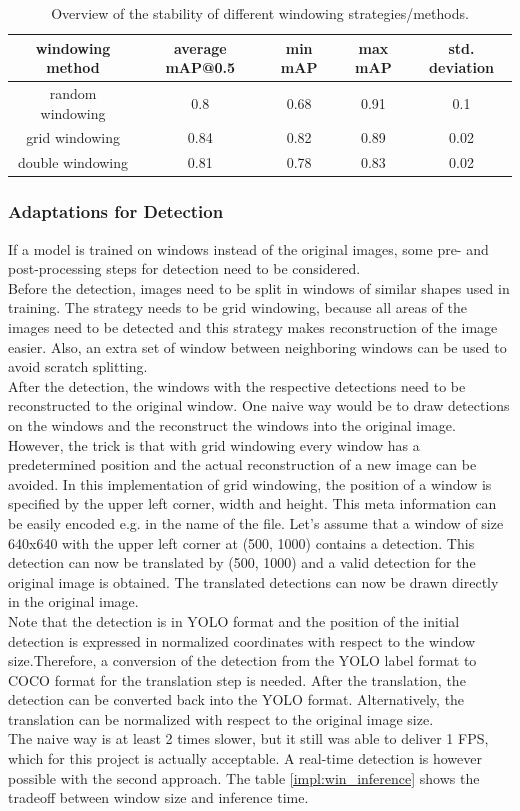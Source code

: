 \begin{table}
\centering
\begin{tabular}{ ||c|c|c|c|c||}
\hline
windowing method & average mAP@0.5 & min mAP & max mAP & std. deviation\\ [0.5ex]
\hline\hline
random windowing & 0.8 & 0.68 & 0.91 & 0.1 \\
grid windowing & 0.84  & 0.82 & 0.89 & 0.02 \\
double windowing & 0.81  & 0.78 & 0.83 & 0.02 \\
\hline
\end{tabular}
\caption{Overview of the stability of different windowing strategies/methods.}
\label{impl:win_strategy}
\end{table}

\subsubsection{Adaptations for Detection}
If a model is trained on windows instead of the original images, some pre- and post-processing steps for detection need to be considered. \\
Before the detection, images need to be split in windows of similar shapes used in training. The strategy needs to be grid windowing, because all areas of the images need to be detected and this strategy makes reconstruction of the image easier. Also, an extra set of window between neighboring windows can be used to avoid scratch splitting. \\
After the detection, the windows with the respective detections need to be reconstructed to the original window. One naive way would be to draw detections on the windows and the reconstruct the windows into the original image. However, the trick is that with grid windowing every window has a predetermined position and the actual reconstruction of a new image can be avoided. In this implementation of grid windowing, the position of a window is specified by the upper left corner, width and height. This meta information can be easily encoded e.g. in the name of the file. Let's assume that a window of size 640x640 with the upper left corner at (500, 1000) contains a detection. This detection can now be translated by (500, 1000) and a valid detection for the original image is obtained. The translated detections can now be drawn directly in the original image.\\
Note that the detection is in YOLO format and the position of the initial detection is expressed in normalized coordinates with respect to the window size.Therefore, a conversion of the detection from the YOLO label format to COCO format \cite{coco_site} for the translation step is needed. After the translation, the detection can be converted back into the YOLO format.  Alternatively, the translation can be normalized with respect to the original image size.\\
The naive way is at least 2 times slower, but it still was able to deliver 1 FPS, which for this project is actually acceptable. A real-time detection is however possible with the second approach. The table \ref{impl:win_inference} shows the tradeoff between window size and inference time. \\

